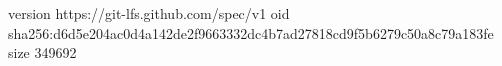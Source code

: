 version https://git-lfs.github.com/spec/v1
oid sha256:d6d5e204ac0d4a142de2f9663332dc4b7ad27818cd9f5b6279c50a8c79a183fe
size 349692
